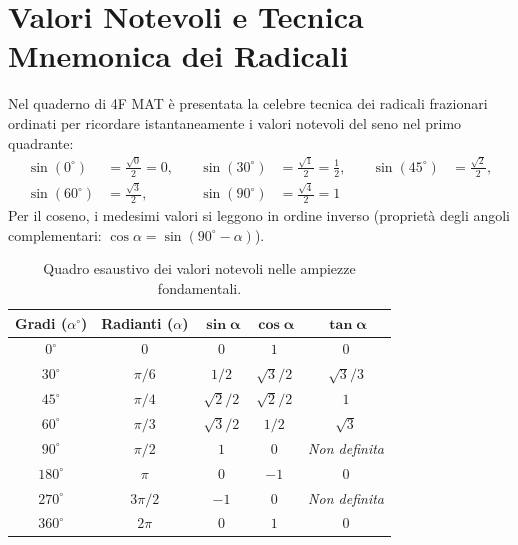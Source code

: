 \documentclass[11pt,a4paper,oneside]{report}
\begin{document}
\section{Valori Notevoli e Tecnica Mnemonica dei Radicali}
Nel quaderno di 4F MAT è presentata la celebre tecnica dei radicali frazionari ordinati per ricordare istantaneamente i valori notevoli del seno nel primo quadrante:
\begin{equation}
\begin{aligned}
    \sin(0^\circ) &= \frac{\sqrt{0}}{2} = 0, \quad &
    \sin(30^\circ) &= \frac{\sqrt{1}}{2} = \frac{1}{2}, \quad &
    \sin(45^\circ) &= \frac{\sqrt{2}}{2}, \\
    \sin(60^\circ) &= \frac{\sqrt{3}}{2}, \quad &
    \sin(90^\circ) &= \frac{\sqrt{4}}{2} = 1
\end{aligned}
\end{equation}
Per il coseno, i medesimi valori si leggono in ordine inverso (proprietà degli angoli complementari: $\cos\alpha = \sin(90^\circ - \alpha)$).

\begin{table}[htbp]
\centering
\caption{Quadro esaustivo dei valori notevoli nelle ampiezze fondamentali.}
\label{tab:valori_notevoli}
\begin{tabular}{ccccc}
\toprule
\textbf{Gradi ($\alpha^\circ$)} & \textbf{Radianti ($\alpha$)} & $\mathbf{\sin\alpha}$ & $\mathbf{\cos\alpha}$ & $\mathbf{\tan\alpha}$ \\
\midrule
$0^\circ$ & $0$ & $0$ & $1$ & $0$ \\
$30^\circ$ & $\pi/6$ & $1/2$ & $\sqrt{3}/2$ & $\sqrt{3}/3$ \\
$45^\circ$ & $\pi/4$ & $\sqrt{2}/2$ & $\sqrt{2}/2$ & $1$ \\
$60^\circ$ & $\pi/3$ & $\sqrt{3}/2$ & $1/2$ & $\sqrt{3}$ \\
$90^\circ$ & $\pi/2$ & $1$ & $0$ & \emph{Non definita} \\
$180^\circ$ & $\pi$ & $0$ & $-1$ & $0$ \\
$270^\circ$ & $3\pi/2$ & $-1$ & $0$ & \emph{Non definita} \\
$360^\circ$ & $2\pi$ & $0$ & $1$ & $0$ \\
\bottomrule
\end{tabular}
\end{table}
\end{document}
